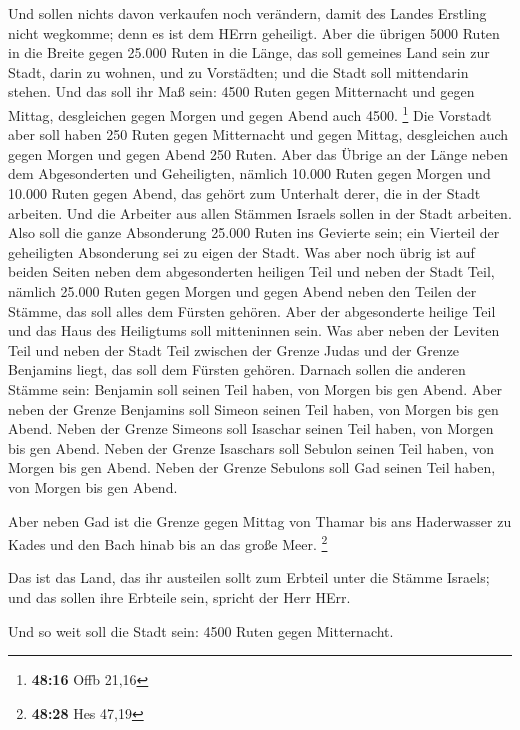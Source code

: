 Und sollen nichts davon verkaufen noch verändern, damit des Landes
Erstling nicht wegkomme; denn es ist dem HErrn geheiligt. 
Aber die übrigen 5000 Ruten in die Breite gegen 25.000 Ruten in die
Länge, das soll gemeines Land sein zur Stadt, darin zu wohnen, und zu
Vorstädten; und die Stadt soll mittendarin stehen.  Und das
soll ihr Maß sein: 4500 Ruten gegen Mitternacht und gegen Mittag,
desgleichen gegen Morgen und gegen Abend auch 4500. \footnote{\textbf{48:16}
  Offb 21,16}  Die Vorstadt aber soll haben 250 Ruten gegen
Mitternacht und gegen Mittag, desgleichen auch gegen Morgen und gegen
Abend 250 Ruten.  Aber das Übrige an der Länge neben dem
Abgesonderten und Geheiligten, nämlich 10.000 Ruten gegen Morgen und
10.000 Ruten gegen Abend, das gehört zum Unterhalt derer, die in der
Stadt arbeiten.  Und die Arbeiter aus allen Stämmen Israels
sollen in der Stadt arbeiten.  Also soll die ganze
Absonderung 25.000 Ruten ins Gevierte sein; ein Vierteil der geheiligten
Absonderung sei zu eigen der Stadt.  Was aber noch übrig
ist auf beiden Seiten neben dem abgesonderten heiligen Teil und neben
der Stadt Teil, nämlich 25.000 Ruten gegen Morgen und gegen Abend neben
den Teilen der Stämme, das soll alles dem Fürsten gehören. Aber der
abgesonderte heilige Teil und das Haus des Heiligtums soll mitteninnen
sein.  Was aber neben der Leviten Teil und neben der Stadt
Teil zwischen der Grenze Judas und der Grenze Benjamins liegt, das soll
dem Fürsten gehören.  Darnach sollen die anderen Stämme
sein: Benjamin soll seinen Teil haben, von Morgen bis gen Abend.
 Aber neben der Grenze Benjamins soll Simeon seinen Teil
haben, von Morgen bis gen Abend.  Neben der Grenze Simeons
soll Isaschar seinen Teil haben, von Morgen bis gen Abend. 
Neben der Grenze Isaschars soll Sebulon seinen Teil haben, von Morgen
bis gen Abend.  Neben der Grenze Sebulons soll Gad seinen
Teil haben, von Morgen bis gen Abend.

 Aber neben Gad ist die Grenze gegen Mittag von Thamar bis
ans Haderwasser zu Kades und den Bach hinab bis an das große Meer.
\footnote{\textbf{48:28} Hes 47,19}

 Das ist das Land, das ihr austeilen sollt zum Erbteil
unter die Stämme Israels; und das sollen ihre Erbteile sein, spricht der
Herr HErr.

 Und so weit soll die Stadt sein: 4500 Ruten gegen
Mitternacht.

